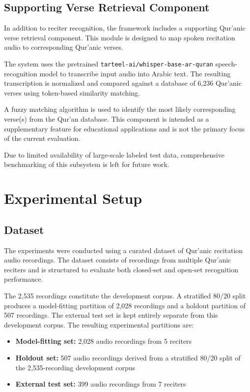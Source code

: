 \documentclass[conference]{IEEEtran}
\begin{document}
\subsection{Supporting Verse Retrieval Component}

In addition to reciter recognition, the framework includes a supporting Qur'anic verse retrieval component. This module is designed to map spoken recitation audio to corresponding Qur'anic verses.

The system uses the pretrained \texttt{tarteel-ai/whisper-base-ar-quran} speech-recognition model \cite{tarteelwhisper} to transcribe input audio into Arabic text. The resulting transcription is normalized and compared against a database of 6,236 Qur'anic verses using token-based similarity matching.

A fuzzy matching algorithm is used to identify the most likely corresponding verse(s) from the Qur'an database. This component is intended as a supplementary feature for educational applications and is not the primary focus of the current evaluation.

Due to limited availability of large-scale labeled test data, comprehensive benchmarking of this subsystem is left for future work.

\section{Experimental Setup}

\subsection{Dataset}

The experiments were conducted using a curated dataset of Qur'anic recitation audio recordings. The dataset consists of recordings from multiple Qur'anic reciters and is structured to evaluate both closed-set and open-set recognition performance.

The 2,535 recordings constitute the development corpus. A stratified 80/20 split produces a model-fitting partition of 2,028 recordings and a holdout partition of 507 recordings. The external test set is kept entirely separate from this development corpus. The resulting experimental partitions are:

\begin{itemize}
\item \textbf{Model-fitting set:} 2,028 audio recordings from 5 reciters
\item \textbf{Holdout set:} 507 audio recordings derived from a stratified 80/20 split of the 2,535-recording development corpus
\item \textbf{External test set:} 399 audio recordings from 7 reciters
\end{itemize}
\end{document}
